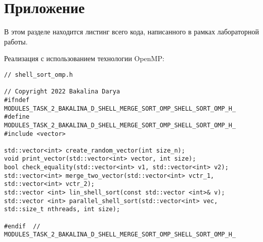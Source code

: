 \documentclass{report}
\begin{document}
\section*{Приложение}
В этом разделе находится листинг всего кода, написанного в рамках лабораторной работы.
\par Реализация с использованием технологии OpenMP:
\begin{lstlisting}
// shell_sort_omp.h

// Copyright 2022 Bakalina Darya
#ifndef MODULES_TASK_2_BAKALINA_D_SHELL_MERGE_SORT_OMP_SHELL_SORT_OMP_H_
#define MODULES_TASK_2_BAKALINA_D_SHELL_MERGE_SORT_OMP_SHELL_SORT_OMP_H_
#include <vector>

std::vector<int> create_random_vector(int size_n);
void print_vector(std::vector<int> vector, int size);
bool check_equality(std::vector<int> v1, std::vector<int> v2);
std::vector<int> merge_two_vector(std::vector<int> vctr_1, std::vector<int> vctr_2);
std::vector <int> lin_shell_sort(const std::vector <int>& v);
std::vector <int> parallel_shell_sort(std::vector<int> vec, std::size_t nthreads, int size);

#endif  // MODULES_TASK_2_BAKALINA_D_SHELL_MERGE_SORT_OMP_SHELL_SORT_OMP_H_


\end{lstlisting}
\end{document}
